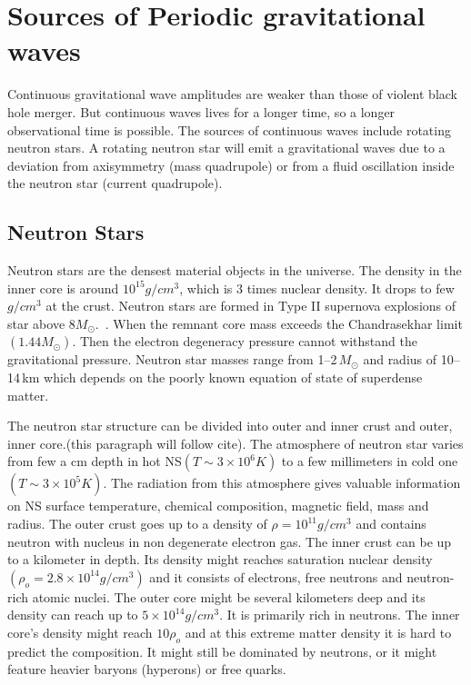 \documentclass{ttuthes2007}
\begin{document}
\section{Sources of Periodic gravitational waves}
Continuous gravitational wave amplitudes are weaker than those of violent black
hole merger. But continuous waves lives for a longer time, so a longer
observational time is possible. The sources of continuous waves include
rotating neutron stars. A
rotating neutron star will emit a gravitational waves due to a deviation from
axisymmetry (mass quadrupole) or from a fluid oscillation inside the neutron
star (current quadrupole). 

\subsection{Neutron Stars}

Neutron stars are the densest material objects in the universe. The density in
the inner core is around $10^{15} g/cm^3$,
which is 3 times nuclear density. It drops to few $g/cm^3$ at the crust. Neutron
stars
are formed in Type II supernova explosions of 
star above $8M_\odot$.~\cite{Lattimer_2004}. When the remnant core
mass exceeds the Chandrasekhar limit$(1.44M_\odot)$. Then the electron
degeneracy pressure cannot withstand the gravitational pressure. Neutron star
masses range from 1--2\,$M_\odot$ and radius of 10--14\,km which depends on
the poorly known equation of state of superdense matter. 
	
The neutron star structure can be divided into outer and inner crust and outer, inner
core.(this paragraph will follow cite). The atmosphere of neutron star varies
from few a cm depth in hot \ac{NS}$(T\sim3\times10^6K)$ to a few millimeters in cold one
$(T\sim3\times10^5K)$. The radiation from this atmosphere gives valuable
information on \ac{NS} surface temperature, chemical composition, magnetic
field, mass and radius. The outer crust goes up to a density of
$\rho=10^{11}g/cm^3$ and contains neutron with nucleus in non degenerate electron gas. The inner crust
can be up to a kilometer in depth. Its density might reaches saturation nuclear
density$(\rho_o=2.8\times10^{14}g/cm^3)$ and it consists of
electrons, free neutrons and neutron-rich atomic nuclei. The outer core might be
several kilometers deep and its density can reach up to $5\times10^{14}g/cm^3$.
It is
primarily rich in neutrons. The inner core's density might reach $10\rho_o$ and
at this extreme matter density it is hard to predict the composition. It might
still be dominated by neutrons, or it might feature heavier baryons (hyperons)
or free quarks. 
\end{document}
